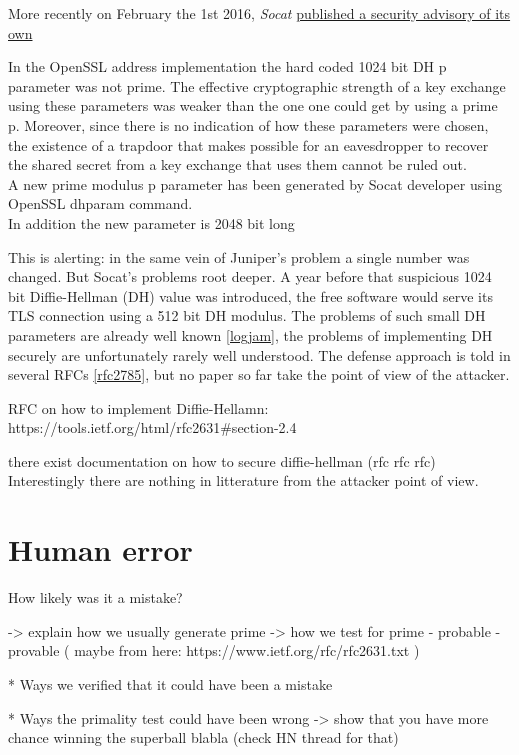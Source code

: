 \documentclass[a4paper,11pt]{article}
\begin{document}
More recently on February the 1st 2016, \emph{Socat} \href{http://www.openwall.com/lists/oss-security/2016/02/01/4}{published a security advisory of its own}

\begin{displayquote}
In the OpenSSL address implementation the hard coded 1024 bit DH p parameter was not prime. The effective cryptographic strength of a key exchange using these parameters was weaker than the one one could get by using a prime p. Moreover, since there is no indication of how these parameters were chosen, the existence of a trapdoor that makes possible for an eavesdropper to recover the shared secret from a key exchange that uses them cannot be ruled out.\\
A new prime modulus p parameter has been generated by Socat developer using OpenSSL dhparam command.\\
In addition the new parameter is 2048 bit long
\end{displayquote}

This is alerting: in the same vein of Juniper's problem a single number was changed. But Socat's problems root deeper. A year before that suspicious 1024 bit Diffie-Hellman (DH) value was introduced, the free software would serve its TLS connection using a 512 bit DH modulus. The problems of such small DH parameters are already well known \ref{logjam}, the problems of implementing DH securely are unfortunately rarely well understood. The defense approach is told in several RFCs \ref{rfc2785}, but no paper so far take the point of view of the attacker.

RFC on how to implement Diffie-Hellamn: https://tools.ietf.org/html/rfc2631#section-2.4

there exist documentation on how to secure diffie-hellman (rfc rfc rfc) Interestingly there are nothing in litterature from the attacker point of view.

\section{Human error}\label{mistake}

How likely was it a mistake?

-> explain how we usually generate prime
-> how we test for prime
    - probable
    - provable
    ( maybe from here: https://www.ietf.org/rfc/rfc2631.txt )

* Ways we verified that it could have been a mistake

* Ways the primality test could have been wrong -> show that you have more chance winning the superball blabla (check HN thread for that)
\end{document}
